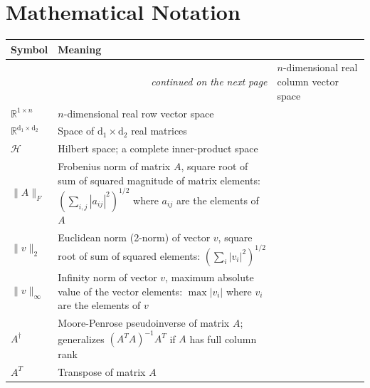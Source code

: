 \section*{Mathematical Notation}
\begingroup
\renewcommand{\arraystretch}{0.88}
\begin{longtable}{p{1.7cm} p{11.6cm}}
    \label{tab:Operators}\\
    Symbol & Meaning \\
    \toprule
    \endfirsthead
    \toprule
    \endhead
    \bottomrule \multicolumn{2}{r}{\emph{continued on the next page}}
    \endfoot
    \bottomrule
    \endlastfoot
    $\mathbb{R}^{n \times 1}$ & $n$-dimensional real column vector space \\
    $\mathbb{R}^{1 \times n}$ & $n$-dimensional real row vector space \\
    $\mathbb{R}^{\mathrm{d_1}\times \mathrm{d_2}}$ & Space of $\mathrm{d_1} \times \mathrm{d_2}$ real matrices \\
    $\mathcal{H}$ & Hilbert space; a complete inner-product space \\
    $\|A\|_F$ & Frobenius norm of matrix $A$, square root of sum of squared magnitude of matrix elements: $\left( \sum_{i,j} |a_{ij}|^2 \right)^{1/2}$ where $a_{ij}$ are the elements of $A$\\
    $\|v\|_2$ & Euclidean norm (2-norm) of vector $v$, square root of sum of squared elements: $\left( \sum_{i} |v_{i}|^2 \right)^{1/2}$ \\
    $\| v\|_{\infty} $ & Infinity norm of vector $v$, maximum absolute value of the vector elements: $\max |v_{i}|$ where $v_{i}$ are the elements of $v$\\
    $A^{\dagger}$ & Moore-Penrose pseudoinverse of matrix $A$; generalizes $(A^{T}A)^{-1}A^{T}$ if $A$ has full column rank \\
    $A^T$ & Transpose of matrix $A$ \\[4pt]
\end{longtable}
\endgroup

